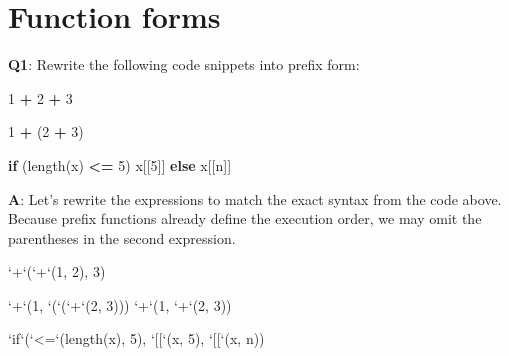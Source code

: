 \documentclass[
]{krantz}
\makeatletter
\newenvironment{Shaded}{\begin{snugshade}}{\end{snugshade}}
\newcommand{\ControlFlowTok}[1]{\textcolor[rgb]{0.13,0.29,0.53}{\textbf{#1}}}
\newcommand{\DataTypeTok}[1]{\textcolor[rgb]{0.13,0.29,0.53}{#1}}
\newcommand{\DecValTok}[1]{\textcolor[rgb]{0.00,0.00,0.81}{#1}}
\newcommand{\KeywordTok}[1]{\textcolor[rgb]{0.13,0.29,0.53}{\textbf{#1}}}
\newcommand{\NormalTok}[1]{#1}
\newcommand{\OperatorTok}[1]{\textcolor[rgb]{0.81,0.36,0.00}{\textbf{#1}}}
\newcommand{\StringTok}[1]{\textcolor[rgb]{0.31,0.60,0.02}{#1}}
\newenvironment{kframe}{%
\medskip{}
\setlength{\fboxsep}{.8em}
 \def\at@end@of@kframe{}%
 \ifinner\ifhmode%
  \def\at@end@of@kframe{\end{minipage}}%
  \begin{minipage}{\columnwidth}%
 \fi\fi%
 \def\FrameCommand##1{\hskip\@totalleftmargin \hskip-\fboxsep
 \colorbox{shadecolor}{##1}\hskip-\fboxsep
     \hskip-\linewidth \hskip-\@totalleftmargin \hskip\columnwidth}%
 \MakeFramed {\advance\hsize-\width
   \@totalleftmargin\z@ \linewidth\hsize
   \@setminipage}}%
 {\par\unskip\endMakeFramed%
 \at@end@of@kframe}
\renewenvironment{Shaded}{\begin{kframe}}{\end{kframe}}
\renewcommand{\KeywordTok} [1]{\textcolor[rgb]{0.00,0.44,0.13}{{#1}}}
\renewcommand{\DataTypeTok}[1]{\textcolor[rgb]{0.56,0.13,0.00}{{#1}}}
\renewcommand{\DecValTok}  [1]{\textcolor[rgb]{0.25,0.63,0.44}{{#1}}}
\renewcommand{\StringTok}  [1]{\textcolor[rgb]{0.25,0.44,0.63}{{#1}}}
\renewcommand{\NormalTok}  [1]{{#1}}
\makeatother
\begin{document}
\hypertarget{function-forms}{%
\section{Function forms}\label{function-forms}}

\textbf{{Q1}}: Rewrite the following code snippets into prefix form:

\begin{Shaded}
\begin{Highlighting}[]
\DecValTok{1} \OperatorTok{+}\StringTok{ }\DecValTok{2} \OperatorTok{+}\StringTok{ }\DecValTok{3}

\DecValTok{1} \OperatorTok{+}\StringTok{ }\NormalTok{(}\DecValTok{2} \OperatorTok{+}\StringTok{ }\DecValTok{3}\NormalTok{)}

\ControlFlowTok{if}\NormalTok{ (}\KeywordTok{length}\NormalTok{(x) }\OperatorTok{<=}\StringTok{ }\DecValTok{5}\NormalTok{) x[[}\DecValTok{5}\NormalTok{]] }\ControlFlowTok{else}\NormalTok{ x[[n]]}
\end{Highlighting}
\end{Shaded}

\textbf{{A}}: Let's rewrite the expressions to match the exact syntax from the code above. Because prefix functions already define the execution order, we may omit the parentheses in the second expression.

\begin{Shaded}
\begin{Highlighting}[]
\StringTok{`}\DataTypeTok{+}\StringTok{`}\NormalTok{(}\StringTok{`}\DataTypeTok{+}\StringTok{`}\NormalTok{(}\DecValTok{1}\NormalTok{, }\DecValTok{2}\NormalTok{), }\DecValTok{3}\NormalTok{)}

\StringTok{`}\DataTypeTok{+}\StringTok{`}\NormalTok{(}\DecValTok{1}\NormalTok{, }\StringTok{`}\DataTypeTok{(}\StringTok{`}\NormalTok{(}\StringTok{`}\DataTypeTok{+}\StringTok{`}\NormalTok{(}\DecValTok{2}\NormalTok{, }\DecValTok{3}\NormalTok{)))}
\StringTok{`}\DataTypeTok{+}\StringTok{`}\NormalTok{(}\DecValTok{1}\NormalTok{, }\StringTok{`}\DataTypeTok{+}\StringTok{`}\NormalTok{(}\DecValTok{2}\NormalTok{, }\DecValTok{3}\NormalTok{))}

\StringTok{`}\DataTypeTok{if}\StringTok{`}\NormalTok{(}\StringTok{`}\DataTypeTok{<=}\StringTok{`}\NormalTok{(}\KeywordTok{length}\NormalTok{(x), }\DecValTok{5}\NormalTok{), }\StringTok{`}\DataTypeTok{[[}\StringTok{`}\NormalTok{(x, }\DecValTok{5}\NormalTok{), }\StringTok{`}\DataTypeTok{[[}\StringTok{`}\NormalTok{(x, n))}
\end{Highlighting}
\end{Shaded}
\end{document}
